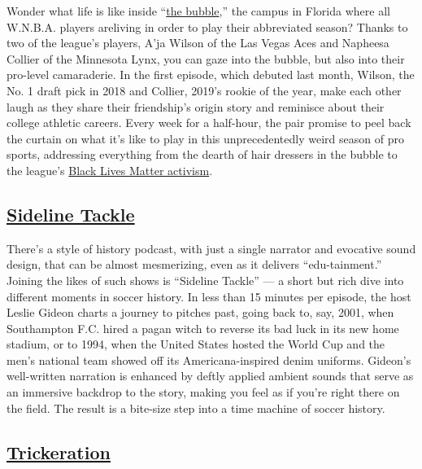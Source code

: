 Wonder what life is like inside
``\href{https://www.nytimes.com/2020/07/20/sports/basketball/nba-bubble-life-twitter.html}{the
bubble},'' the campus in Florida where all W.N.B.A. players areliving in
order to play their abbreviated season? Thanks to two of the league's
players, A'ja Wilson of the Las Vegas Aces and Napheesa Collier of the
Minnesota Lynx, you can gaze into the bubble, but also into their
pro-level camaraderie. In the first episode, which debuted last month,
Wilson, the No. 1 draft pick in 2018 and Collier, 2019's rookie of the
year, make each other laugh as they share their friendship's origin
story and reminisce about their college athletic careers. Every week for
a half-hour, the pair promise to peel back the curtain on what it's like
to play in this unprecedentedly weird season of pro sports, addressing
everything from the dearth of hair dressers in the bubble to the
league's
\href{https://www.nytimes.com/2020/08/04/sports/basketball/wnba-dream-loeffler-warnock.html}{Black
Lives Matter activism}.

\hypertarget{sideline-tackle}{%
\subsection{\texorpdfstring{\href{https://www.sidelinetackle.com/listen}{Sideline
Tackle}}{Sideline Tackle}}\label{sideline-tackle}}

There's a style of history podcast, with just a single narrator and
evocative sound design, that can be almost mesmerizing, even as it
delivers ``edu-tainment.'' Joining the likes of such shows is ``Sideline
Tackle'' --- a short but rich dive into different moments in soccer
history. In less than 15 minutes per episode, the host Leslie Gideon
charts a journey to pitches past, going back to, say, 2001, when
Southampton F.C. hired a pagan witch to reverse its bad luck in its new
home stadium, or to 1994, when the United States hosted the World Cup
and the men's national team showed off its Americana-inspired denim
uniforms. Gideon's well-written narration is enhanced by deftly applied
ambient sounds that serve as an immersive backdrop to the story, making
you feel as if you're right there on the field. The result is a
bite-size step into a time machine of soccer history.

\hypertarget{trickeration}{%
\subsection{\texorpdfstring{\href{https://www.iheart.com/podcast/1119-trickeration-63877804/}{Trickeration}}{Trickeration}}\label{trickeration}}

